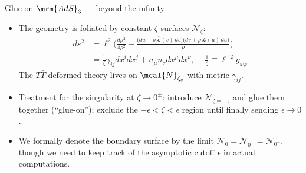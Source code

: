 \documentclass[
	10pt
	,noamsthm
]{beamer}
\newcommand{\TTbar}{\texorpdfstring{\ensuremath{T\bar{T}}}{TTbar}\xspace}
\begin{document}
\begin{frame}{Glue-on $\mrm{AdS}_3$ --- beyond the infinity}{%
	\textcite{Apolo:2023vnm} -- 
}
\begin{itemize}
\item The geometry is foliated by constant $\zeta$ surfaces ${\mathcal N}_\zeta$:
	\begin{equation}
	\begin{aligned}
		ds^2 
		&= \ell^2 \bigg( \frac{d\rho^2}{4 \rho^2} + \frac{ \big( du + \rho \, \mathcal {\bar L}(v)\, dv \big) \big( dv + \rho \, \mathcal L(u)\, du \big) }{\rho} \bigg) \\
		&= \frac{1}{\zeta} \gamma_{ij}dx^i dx^j+n_\mu n_\nu dx^\mu dx^\nu,\ \quad
	\frac{1}{\zeta} \equiv \ell^{-2} g_{\varphi\varphi}
	\end{aligned}
	\end{equation}
	The \TTbar deformed theory lives on $\mcal{N}_{\zeta_c}$ with metric $\gamma_{ij}$.
	
\pause
\item Treatment for the singularity at $\zeta\to 0^\pm$: introduce $\mathcal N_{\zeta={\pm\epsilon}}$ and glue them together (``glue-on'');
	exclude the $-\epsilon < \zeta < \epsilon$ region until finally sending $\epsilon \to 0$. 
\item We formally denote the boundary surface by the limit $\mathcal N_{0}=\mathcal N_{0^+}=\mathcal N_{0^-}$, though we need to keep track of the asymptotic cutoff $\epsilon$ in actual computations.
\end{itemize}
\end{frame}

\newcommand{\stateGlueon}{\ensuremath{
	\textrm{Cutoff / \textit{glue-on} $\mrm{AdS}_{d+1}$ Gravity}
	\ \equiv\ %
	\textrm{\TTbar deformed $\mrm{CFT}_{d}$ at $\mcal{N}_{\zeta_c}$}\ \,
}}
\end{document}
